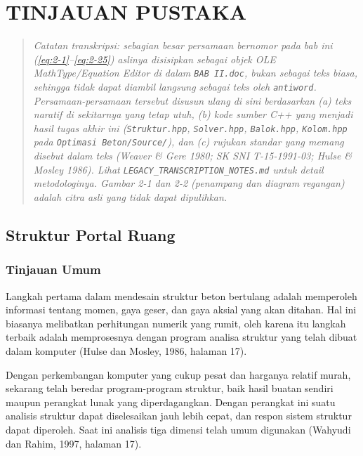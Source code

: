 \chapter{TINJAUAN PUSTAKA}
\label{bab:tinjauan}

\begin{quote}
\small\itshape
Catatan transkripsi: sebagian besar persamaan bernomor pada bab ini
(\eqref{eq:2-1}--\eqref{eq:2-25}) aslinya disisipkan sebagai objek OLE
\textit{MathType/Equation Editor} di dalam \texttt{BAB II.doc}, bukan sebagai
teks biasa, sehingga tidak dapat diambil langsung sebagai teks oleh
\texttt{antiword}. Persamaan-persamaan tersebut disusun ulang di sini
berdasarkan (a) teks naratif di sekitarnya yang tetap utuh, (b) kode sumber
C++ yang menjadi hasil tugas akhir ini (\texttt{Struktur.hpp},
\texttt{Solver.hpp}, \texttt{Balok.hpp}, \texttt{Kolom.hpp} pada
\texttt{Optimasi Beton/Source/}), dan (c) rujukan standar yang memang
disebut dalam teks (Weaver \& Gere 1980; SK SNI T-15-1991-03; Hulse \&
Mosley 1986). Lihat \texttt{LEGACY\_TRANSCRIPTION\_NOTES.md} untuk detail
metodologinya. Gambar 2-1 dan 2-2 (penampang dan diagram regangan) adalah
citra asli yang tidak dapat dipulihkan.
\end{quote}

\section{Struktur Portal Ruang}

\subsection{Tinjauan Umum}

Langkah pertama dalam mendesain struktur beton bertulang adalah memperoleh
informasi tentang momen, gaya geser, dan gaya aksial yang akan ditahan. Hal
ini biasanya melibatkan perhitungan numerik yang rumit, oleh karena itu
langkah terbaik adalah memprosesnya dengan program analisa struktur yang
telah dibuat dalam komputer (Hulse dan Mosley, 1986, halaman 17).

Dengan perkembangan komputer yang cukup pesat dan harganya relatif murah,
sekarang telah beredar program-program struktur, baik hasil buatan sendiri
maupun perangkat lunak yang diperdagangkan. Dengan perangkat ini suatu
analisis struktur dapat diselesaikan jauh lebih cepat, dan respon sistem
struktur dapat diperoleh. Saat ini analisis tiga dimensi telah umum
digunakan (Wahyudi dan Rahim, 1997, halaman 17).

